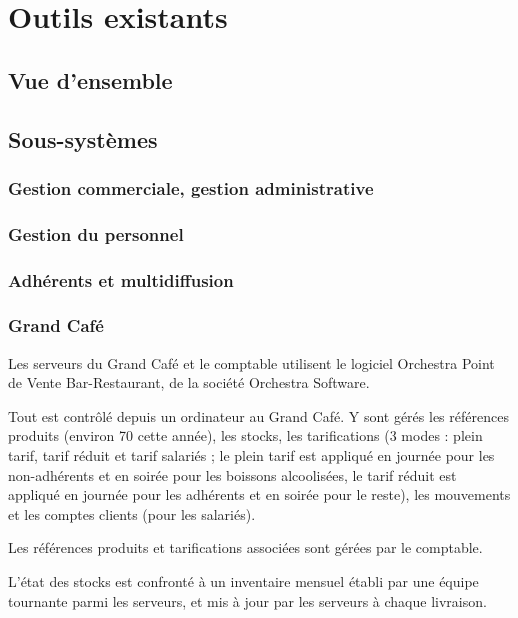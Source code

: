\section{Outils existants}
\subsection{Vue d'ensemble}



\subsection{Sous-systèmes}

\subsubsection{Gestion commerciale, gestion administrative}

\subsubsection{Gestion du personnel}

\subsubsection{Adhérents et multidiffusion}

\subsubsection{Grand Café}

Les serveurs du Grand Café et le comptable utilisent le logiciel Orchestra
Point de Vente Bar-Restaurant, de la société Orchestra Software.

Tout est contrôlé depuis un ordinateur au Grand Café. Y sont gérés les
références produits (environ 70 cette année), les stocks, les tarifications
(3 modes : plein tarif, tarif réduit et tarif salariés ; le plein tarif
est appliqué en journée pour les non-adhérents et en soirée pour les boissons
alcoolisées, le tarif réduit est appliqué en journée pour les adhérents
et en soirée pour le reste), les mouvements et les comptes clients (pour les
salariés).

Les références produits et tarifications associées sont gérées par le comptable.

L'état des stocks est confronté à un inventaire mensuel établi par une équipe
tournante parmi les serveurs, et mis à jour par les serveurs à chaque
livraison.

